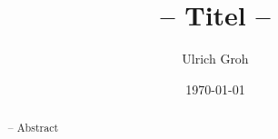 \documentclass[%
	,a4paper 
	,12pt 
	,oneside
	,english %
	]{amsart}
\title{-- Titel --}
\date{\today}
\author{Ulrich Groh}
\begin{document}
\begin{abstract}
 -- Abstract
\end{abstract}
\maketitle
\thispagestyle{empty}
\tableofcontents
\section{}\label{sec:xyz}
\subsection{}\label{subsec:xyz}
\printbibliography
\end{document}
